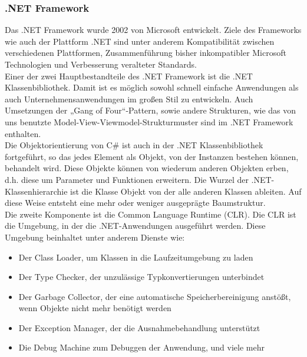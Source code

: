 \documentclass[12pt,a4paper,headinclude,twoside, plainheadsepline, open=right,numbers=noenddot]{scrreprt}
\begin{document}
\subsubsection{.NET Framework} 
Das .NET Framework wurde 2002 von Microsoft entwickelt. Ziele des Frameworks wie auch der Plattform .NET sind unter anderem Kompatibilität zwischen verschiedenen Plattformen, Zusammenführung bisher inkompatibler Microsoft Technologien und Verbesserung veralteter Standards. \cite{DotNet}
\\
Einer der zwei Hauptbestandteile des .NET Framework ist die .NET Klassenbibliothek. Damit ist es möglich sowohl schnell einfache Anwendungen als auch Unternehmensanwendungen im großen Stil zu entwickeln. Auch Umsetzungen der „Gang of Four“-Pattern, sowie andere Strukturen, wie das von uns benutzte Model-View-Viewmodel-Strukturmuster sind im .NET Framework enthalten.  \\

Die Objektorientierung von C\# ist auch in der .NET Klassenbibliothek fortgeführt, so das jedes Element als Objekt, von der Instanzen bestehen können, behandelt wird. Diese Objekte können von wiederum anderen Objekten erben, d.h. diese um Parameter und Funktionen erweitern. Die Wurzel der .NET-Klassenhierarchie ist die Klasse Objekt von der alle anderen Klassen ableiten. Auf diese Weise entsteht eine mehr oder weniger ausgeprägte Baumstruktur\cite{Kühnel}. \\

Die zweite Komponente ist die Common Language Runtime (CLR). Die CLR ist die Umgebung, in der die .NET-Anwendungen ausgeführt werden. Diese Umgebung beinhaltet unter anderem Dienste wie:
\begin{itemize}
\item Der Class Loader, um Klassen in die Laufzeitumgebung zu laden
\item Der Type Checker, der unzulässige Typkonvertierungen unterbindet
\item Der Garbage Collector, der eine  automatische Speicherbereinigung anstößt, wenn Objekte nicht mehr benötigt werden
\item Der Exception Manager, der die Ausnahmebehandlung unterstützt
\item Die Debug Machine zum Debuggen der Anwendung, und viele mehr \cite{Kühnel}
\end{itemize}
\end{document}
